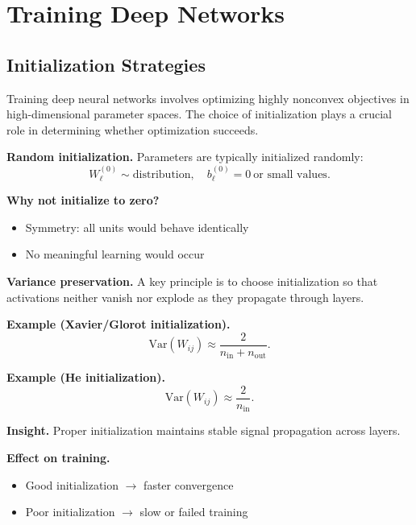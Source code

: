 \chapter{Training Deep Networks}

\section{Initialization Strategies}

Training deep neural networks involves optimizing highly nonconvex objectives in high-dimensional parameter spaces. The choice of initialization plays a crucial role in determining whether optimization succeeds.

\medskip

\noindent
\textbf{Random initialization.}  
Parameters are typically initialized randomly:
\[
W_\ell^{(0)} \sim \text{distribution}, \quad b_\ell^{(0)} = 0 \ \text{or small values}.
\]

\medskip

\noindent
\textbf{Why not initialize to zero?}
\begin{itemize}
    \item Symmetry: all units would behave identically
    \item No meaningful learning would occur
\end{itemize}

\medskip

\noindent
\textbf{Variance preservation.}  
A key principle is to choose initialization so that activations neither vanish nor explode as they propagate through layers.

\medskip

\noindent
\textbf{Example (Xavier/Glorot initialization).}
\[
\mathrm{Var}(W_{ij}) \approx \frac{2}{n_{\text{in}} + n_{\text{out}}}.
\]

\medskip

\noindent
\textbf{Example (He initialization).}
\[
\mathrm{Var}(W_{ij}) \approx \frac{2}{n_{\text{in}}}.
\]

\medskip

\noindent
\textbf{Insight.}  
Proper initialization maintains stable signal propagation across layers.

\medskip

\noindent
\textbf{Effect on training.}
\begin{itemize}
    \item Good initialization $\rightarrow$ faster convergence
    \item Poor initialization $\rightarrow$ slow or failed training
\end{itemize}

